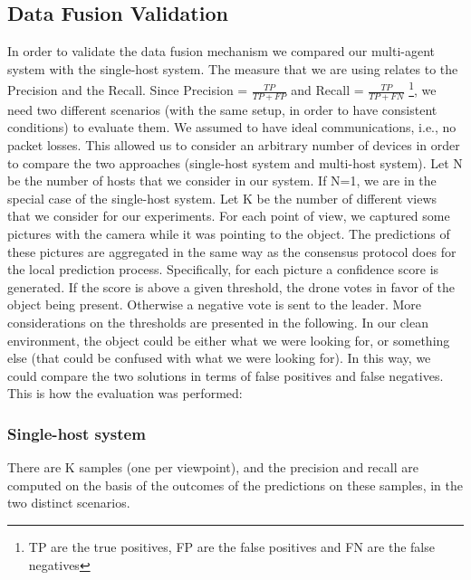 \documentclass[10pt,conference,compsocconf]{IEEEtran}
\begin{document}
\begin{enumerate}
\subsection{Data Fusion Validation}
In order to validate the data fusion mechanism we compared our multi-agent system with the single-host system. The measure that we are using relates to the Precision and the Recall. Since Precision = $\frac{TP}{TP+FP}$ and Recall = $\frac{TP}{TP+FN}$ \footnote{TP are the true positives, FP are the false positives and FN are the false negatives}, we need two different scenarios (with the same setup, in order to have consistent conditions) to evaluate them.
We assumed to have ideal communications, i.e., no packet losses. This allowed us to consider an arbitrary number of devices in order to compare the two approaches (single-host system and multi-host system). Let N be the number of hosts that we consider in our system. If N=1, we are in the special case of the single-host system. Let K be the number of different views that we consider for our experiments. For each point of view, we captured some pictures with the camera while it was pointing to the object. The predictions of these pictures are aggregated in the same way as the consensus protocol does for the local prediction process. Specifically, for each picture a confidence score is generated. If the score is above a given threshold, the drone votes in favor of the object being present. Otherwise a negative vote is sent to the leader. More considerations on the thresholds are presented in the following.
In our clean environment, the object could be either what we were looking for, or something else (that could be confused with what we were looking for). In this way, we could compare the two solutions in terms of false positives and false negatives.
This is how the evaluation was performed:
\subsubsection*{Single-host system}There are K samples (one per viewpoint), and the precision and recall are computed on the basis of the outcomes of the predictions on these samples, in the two distinct scenarios.

\end{enumerate}
\end{document}
